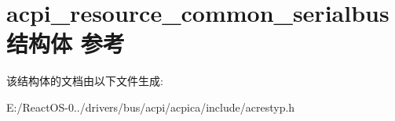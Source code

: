\hypertarget{structacpi__resource__common__serialbus}{}\section{acpi\+\_\+resource\+\_\+common\+\_\+serialbus结构体 参考}
\label{structacpi__resource__common__serialbus}


该结构体的文档由以下文件生成\+:\begin{DoxyCompactItemize}
\item 
E\+:/\+React\+O\+S-\/0../drivers/bus/acpi/acpica/include/acrestyp.\+h\end{DoxyCompactItemize}
